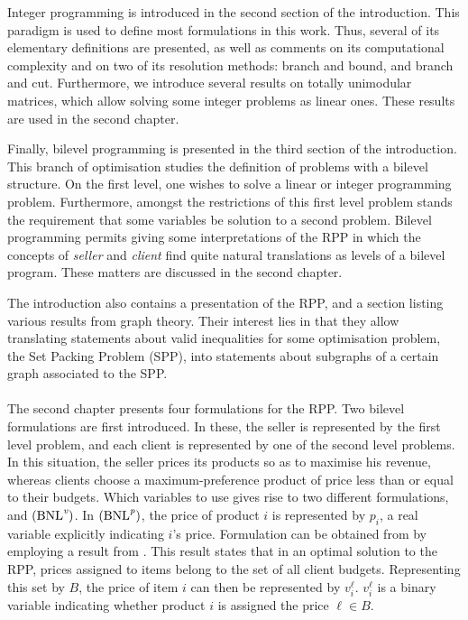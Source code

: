 Integer programming is introduced in the second section of the introduction.
This paradigm is used to define most formulations in this work. Thus, several of
its elementary definitions are presented, as well as comments on its
computational complexity and on two of its resolution methods: branch and bound,
and branch and cut. Furthermore, we introduce several results on totally
unimodular matrices, which allow solving some integer problems as linear ones.
These results are used in the second chapter.

Finally, bilevel programming is presented in the third section of the
introduction. This branch of optimisation studies the definition of problems
with a bilevel structure. On the first level, one wishes to solve a linear or
integer programming problem. Furthermore, amongst the restrictions of this first
level problem stands the requirement that some variables be solution to a second
problem. Bilevel programming permits giving some interpretations of the RPP in
which the concepts of \emph{seller} and \emph{client} find quite natural
translations as levels of a bilevel program. These matters are discussed in the
second chapter.

The introduction also contains a presentation of the RPP, and a section listing
various results from graph theory. Their interest lies in that they allow
translating statements about valid inequalities for some optimisation problem,
the Set Packing Problem (SPP), into statements about subgraphs of a certain
graph associated to the SPP.

\paragraph*{}

The second chapter presents four formulations for the RPP. Two bilevel
formulations are first introduced. In these, the seller is represented by the
first level problem, and each client is represented by one of the second level
problems. In this situation, the seller prices its products so as to maximise
his revenue, whereas clients choose a maximum-preference product of price less
than or equal to their budgets. Which variables to use gives rise to two
different formulations, \bnlp and $\rm{(BNL}^\textit{v}\rm{)}$. In
$\rm{(BNL}^\textit{p}\rm{)}$, the price of product $i$ is represented by $p_i$,
a real variable explicitly indicating $i$'s price.  Formulation \bnlv can be
obtained from \bnlp by employing a result from \cite{ru:nonparametric}. This
result states that in an optimal solution to the RPP, prices assigned to items
belong to the set of all client budgets.  Representing this set by $B$, the
price of item $i$ can then be represented by $v_i^\ell$. $v_i^\ell$ is a binary
variable indicating whether product $i$ is assigned the price $\ell \in B$.


